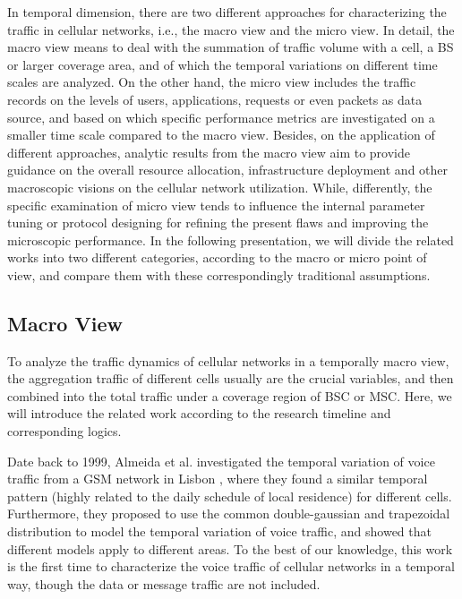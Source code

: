 In temporal dimension, there are two different approaches for characterizing the traffic in cellular networks, i.e., the macro view and the micro view. In detail, the macro view means to deal with the summation of traffic volume with a cell, a BS or larger coverage area, and of which the temporal variations on different time scales are analyzed. On the other hand, the micro view includes the traffic records on the levels of users, applications, requests or even packets as data source, and based on which specific performance metrics are investigated on a smaller time scale compared to the macro view. Besides, on the application of different approaches, analytic results from the macro view aim to provide guidance on the overall resource allocation, infrastructure deployment and other macroscopic visions on the cellular network utilization. While, differently, the specific examination of micro view tends to influence the internal parameter tuning or protocol designing for refining the present flaws and improving the microscopic performance. In the following presentation, we will divide the related works into two different categories, according to the macro or micro point of view, and compare them with these correspondingly traditional assumptions.

\subsection*{Macro View}
To analyze the traffic dynamics of cellular networks in a temporally macro view, the aggregation traffic of different cells usually are the crucial variables, and then combined into the total traffic under a coverage region of BSC or MSC. Here, we will introduce the related work according to the research timeline and corresponding logics.

Date back to 1999, Almeida et al. investigated the temporal variation of voice traffic from a GSM network in Lisbon \cite{almeida1999spatial}, where they found a similar temporal pattern (highly related to the daily schedule of local residence) for different cells. Furthermore, they proposed to use the common double-gaussian and trapezoidal distribution to model the temporal variation of voice traffic, and showed that different models apply to different areas. To the best of our knowledge, this work is the first time to characterize the voice traffic of cellular networks in a temporal way, though the data or message traffic are not included.

